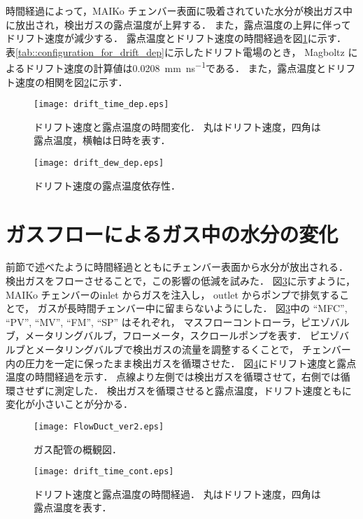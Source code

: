 \documentclass[../master]{subfiles}
\begin{document}
時間経過によって，MAIKo チェンバー表面に吸着されていた水分が検出ガス中に放出され，検出ガスの露点温度が上昇する．
また，露点温度の上昇に伴ってドリフト速度が減少する．
露点温度とドリフト速度の時間経過を図\ref{fig::drift_time_dep}に示す．
表\ref{tab::configuration_for_drift_dep}に示したドリフト電場のとき，
Magboltz によるドリフト速度の計算値は\SI{0.0208}{\milli\metre\per\nano\second}である．
また，露点温度とドリフト速度の相関を図\ref{fig::drift_dew_dep}に示す．
\begin{figure}
  \centering
  \texttt{[image: drift\_time\_dep.eps]}
  \caption[ドリフト速度と露点温度の時間変化．]
          {ドリフト速度と露点温度の時間変化．
          丸はドリフト速度，四角は露点温度，横軸は日時を表す．}
  \label{fig::drift_time_dep}
\end{figure}
\begin{figure}
  \centering
  \texttt{[image: drift\_dew\_dep.eps]}
  \caption{ドリフト速度の露点温度依存性．}
  \label{fig::drift_dew_dep}
\end{figure}

\section{ガスフローによるガス中の水分の変化}
前節で述べたように時間経過とともにチェンバー表面から水分が放出される．
検出ガスをフローさせることで，この影響の低減を試みた．
図\ref{fig::gas_duct}に示すように，MAIKo チェンバーのinlet からガスを注入し，
outlet からポンプで排気することで，
ガスが長時間チェンバー中に留まらないようにした．
図\ref{fig::gas_duct}中の ``MFC'', ``PV'', ``MV'', ``FM'', ``SP'' はそれぞれ，
マスフローコントローラ，ピエゾバルブ，メータリングバルブ，フローメータ，スクロールポンプを表す．
ピエゾバルブとメータリングバルブで検出ガスの流量を調整するくことで，
チェンバー内の圧力を一定に保ったまま検出ガスを循環させた．
図\ref{fig::drift_time_cont}にドリフト速度と露点温度の時間経過を示す．
点線より左側では検出ガスを循環させて，右側では循環させずに測定した．
検出ガスを循環させると露点温度，ドリフト速度ともに変化が小さいことが分かる．
\begin{figure}
  \centering
  \texttt{[image: FlowDuct\_ver2.eps]}
  \caption{ガス配管の概観図．}
  \label{fig::gas_duct}
\end{figure}
\begin{figure}
  \centering
  \texttt{[image: drift\_time\_cont.eps]}
  \caption{ドリフト速度と露点温度の時間経過．
  丸はドリフト速度，四角は露点温度を表す．}
  \label{fig::drift_time_cont}
\end{figure}
\end{document}
